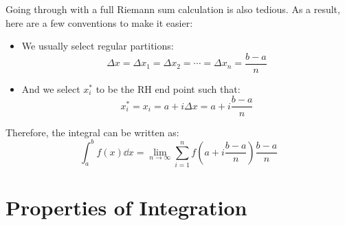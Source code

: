 \documentclass{article}
\begin{document}
\begin{idea}
    Going through with a full Riemann sum calculation is also tedious. As a result, here are a few conventions to make it easier:
    \begin{itemize}
        \item We usually select regular partitions:
        \begin{equation}
            \Delta x = \Delta x_1= \Delta x_2 = \cdots = \Delta x_n = \frac{b-a}{n}
            \label{eq:}
        \end{equation}
        \item And we select $x_i^*$ to be the RH end point such that:
        \begin{equation}
            x_i^* = x_i = a+i\Delta x = a+i\frac{b-a}{n}
            \label{eq:}
        \end{equation}
    \end{itemize}
    Therefore, the integral can be written as:
    \begin{equation}
        \int_a^b f(x) \dd{x} = \lim_{n\to \infty}\sum_{i=1}^n f\left(a+i\frac{b-a}{n}\right)\frac{b-a}{n}
        \label{eq:}
    \end{equation}
\end{idea}
\section{Properties of Integration}
\end{document}
